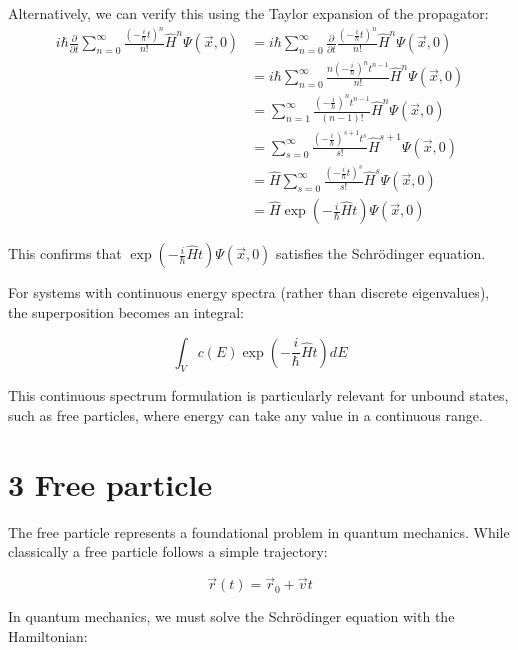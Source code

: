 \documentclass[10pt]{article}
\begin{document}
Alternatively, we can verify this using the Taylor expansion of the propagator:
\begin{align*}
i\hbar\frac{\partial}{\partial t}\sum_{n=0}^{\infty}\frac{\left(-\frac{i}{\hbar}t\right)^n}{n!}\hat{H}^n\Psi(\vec{x},0) &= i\hbar\sum_{n=0}^{\infty}\frac{\partial}{\partial t}\frac{\left(-\frac{i}{\hbar}t\right)^n}{n!}\hat{H}^n\Psi(\vec{x},0) \\
&= i\hbar\sum_{n=0}^{\infty}\frac{n\left(-\frac{i}{\hbar}\right)^nt^{n-1}}{n!}\hat{H}^n\Psi(\vec{x},0) \\
&= \sum_{n=1}^{\infty}\frac{\left(-\frac{i}{\hbar}\right)^nt^{n-1}}{(n-1)!}\hat{H}^n\Psi(\vec{x},0) \tag{2.15} \\
&= \sum_{s=0}^{\infty}\frac{\left(-\frac{i}{\hbar}\right)^{s+1}t^s}{s!}\hat{H}^{s+1}\Psi(\vec{x},0) \\
&= \hat{H}\sum_{s=0}^{\infty}\frac{\left(-\frac{i}{\hbar}t\right)^s}{s!}\hat{H}^s\Psi(\vec{x},0) \\
&= \hat{H}\exp\left(-\frac{i}{\hbar}\hat{H}t\right)\Psi(\vec{x},0)
\end{align*}

This confirms that $\exp\left(-\frac{i}{\hbar}\hat{H}t\right)\Psi(\vec{x},0)$ satisfies the Schrödinger equation.

For systems with continuous energy spectra (rather than discrete eigenvalues), the superposition becomes an integral:

\begin{equation*}
\int_V c(E)\exp\left(-\frac{i}{\hbar}\hat{H}t\right)dE \tag{2.16}
\end{equation*}

This continuous spectrum formulation is particularly relevant for unbound states, such as free particles, where energy can take any value in a continuous range.


\section*{3 Free particle}

The free particle represents a foundational problem in quantum mechanics. While classically a free particle follows a simple trajectory:

\begin{equation*}
\vec{r}(t) = \vec{r}_0 + \vec{v}t \tag{3.1}
\end{equation*}

In quantum mechanics, we must solve the Schrödinger equation with the Hamiltonian:
\end{document}
